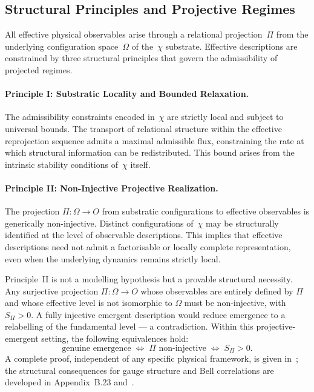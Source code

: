 \subsection{Structural Principles and Projective Regimes}
  \label{subsec:structural-principles-and-projective-regimes}

  All effective physical observables arise through a relational
  projection~$\Pi$ from the underlying configuration space~$\Omega$ of
  the~$\chi$ substrate.
  Effective descriptions are constrained by three structural principles that
  govern the admissibility of projected regimes.

  \paragraph{Principle I: Substratic Locality and Bounded Relaxation.}
    The admissibility constraints encoded in~$\chi$ are strictly local and
    subject to universal bounds.
    The transport of relational structure within the effective reprojection
    sequence admits a maximal admissible flux, constraining the rate at which
    structural information can be redistributed.
    This bound arises from the intrinsic stability conditions of~$\chi$ itself.

  \paragraph{Principle II: Non-Injective Projective Realization.}
    The projection $\Pi : \Omega \rightarrow O$ from substratic configurations
    to effective observables is generically non-injective.
    Distinct configurations of~$\chi$ may be structurally identified at the
    level of observable descriptions.
    This implies that effective descriptions need not admit a factorisable or
    locally complete representation, even when the underlying dynamics remains
    strictly local.

    \begin{remark}
Principle~II is not a modelling hypothesis but a provable structural necessity.
Any surjective projection $\Pi : \Omega \to O$ whose observables are entirely
defined by $\Pi$ and whose effective level is not isomorphic to $\Omega$ must
be non-injective, with $S_\Pi > 0$.
A fully injective emergent description would reduce emergence to a relabelling
of the fundamental level --- a contradiction.
Within this projective-emergent setting, the following equivalences hold:
\begin{equation}
  \text{genuine emergence}
  \;\Longleftrightarrow\;
  \Pi \text{ non-injective}
  \;\Longleftrightarrow\;
  S_\Pi > 0.
\end{equation}
A complete proof, independent of any specific physical framework, is given
in~\cite{Beau2026l}; the structural consequences for gauge structure and
Bell correlations are developed in Appendix~B.23 and~\cite{Beau2026b}.
    \end{remark}

